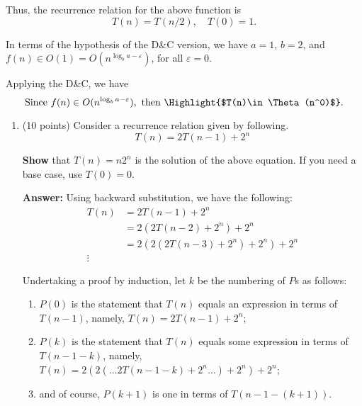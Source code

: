 \documentclass[12pt, a4paper]{article}
\begin{document}
Thus, the recurrence relation for the above function is
\begin{equation*}
  T(n) = T(n/2), \quad T(0) = 1.
\end{equation*}

In terms of the hypothesis of the D\&C version,
we have $a=1$, $b=2$, and $f(n)\in O(1) = O(n^{\log_ba - \varepsilon})$, for all $\varepsilon=0$.

Applying the D\&C, we have
\begin{equation*}
  \textrm{Since } f(n)\in O(n^{\log_ba - \varepsilon}), \textrm{ then } \Highlight{$T(n)\in\Theta(n^0)$}.
\end{equation*}



\newpage



\begin{enumerate}[resume]

  \item (10 points) Consider a recurrence relation given by following.
  \begin{equation*}
    T(n) = 2T(n-1) + 2^n
  \end{equation*}
  
  \textbf{Show} that $T(n)=n2^n$ is the solution of the above equation.
  If you need a base case, use $T(0)=0$.

  \textbf{Answer:} Using backward substitution, we have the following:
  \begin{align*}
    T(n)
      &= 2T(n-1) + 2^n \\
      &= 2(2T(n-2) + 2^n) + 2^n \\
      &= 2(2(2T(n-3) + 2^n) + 2^n) + 2^n \\
      \vdots
  \end{align*}

  Undertaking a proof by induction, let $k$ be the numbering of $P$s as follows:
  \begin{enumerate}
    
    \item $P(0)$ is the statement that $T(n)$ equals an expression in terms of $T(n-1)$,
      namely, $T(n) = 2T(n-1) + 2^n$;

    \item $P(k)$ is the statement that $T(n)$ equals some expression in terms of $T(n-1-k)$,
     namely, $T(n) = 2(2(\dots 2T(n-1-k) + 2^n \dots) + 2^n) + 2^n$;

    \item and of course, $P(k+1)$ is one in terms of $T(n-1-(k+1))$.


\end{enumerate}
\end{enumerate}
\end{document}
